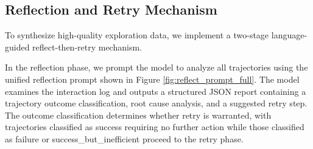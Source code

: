 \begin{table}[h]
\centering
\small
{}
\caption{Dataset statistics and interaction limits for each environment. The Math training set contains 1.79 million problems from DAPO though training typically converges before exhausting the full dataset.}
\label{tab:dataset_stats}
\end{table}

\subsection{Reflection and Retry Mechanism}

To synthesize high-quality exploration data, we implement a two-stage language-guided reflect-then-retry mechanism.

In the reflection phase, we prompt the model to analyze all trajectories using the unified reflection prompt shown in Figure \ref{fig:reflect_prompt_full}. The model examines the interaction log and outputs a structured JSON report containing a trajectory outcome classification, root cause analysis, and a suggested retry step. The outcome classification determines whether retry is warranted, with trajectories classified as success requiring no further action while those classified as failure or success\_but\_inefficient proceed to the retry phase.

